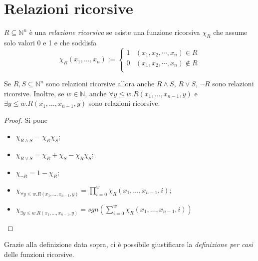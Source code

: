 \section{Relazioni ricorsive}
\begin{defi} $R \subseteq \mathbb{N}^{n}$ è una \emph{relazione
ricorsiva} se esiste una funzione ricorsiva $\chi_R$ che assume solo valori 0 e
1 e che soddisfa
$$\chi_R(x_1, \ldots, x_n):= \left \{ \begin{array}{ll}
                                      1 & (x_{1}, x_{2}, \cdots, x_{n}) \in R\\
                                      0 & (x_{1}, x_{2}, \cdots, x_{n}) \not \in
 R\\
                                      \end{array} \right. $$
\end{defi}
\begin{prop} Se $R, S \subseteq \mathbb{N}^{n}$ sono relazioni
ricorsive allora anche $R\land S$, $R \vee S$, $\neg R$ sono relazioni
ricorsive. Inoltre, se $w \in \mathbb{N}$, anche $\forall y \leq
w. R(x_1, \ldots, x_{n-1}, y)$ e $\exists y \leq w. R(x_1, \ldots,
x_{n-1}, y)$ sono relazioni ricorsive.
\end{prop}
\begin{proof} Si pone
\begin{itemize}
\item $\chi_{R\land S} = \chi_R \chi_S$;
\item $\chi_{R\vee S} = \chi_R + \chi_S - \chi_R  \chi_S$;
\item $\chi_{\neg R} = 1 - \chi_R$;
\item $\chi_{\forall y
\leq w. R(x_1, \ldots, x_{n-1}, y)} = \prod_{i=0}^{w} \chi_R(x_1, \ldots,
x_{n-1},i)$;
\item $\chi_{\exists y
\leq w. R(x_1, \ldots, x_{n-1}, y)} = sgn(\sum_{i=0}^{w} \chi_R(x_1, \ldots,
x_{n-1},i))$
\end{itemize}
\end{proof}

Grazie alla definizione data sopra, ci \`e possibile giustificare la
\emph{definizione per casi} delle funzioni ricorsive.

